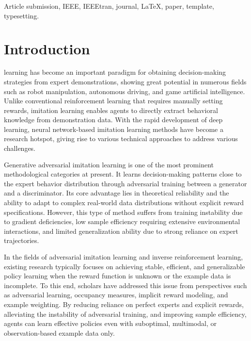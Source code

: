\documentclass[lettersize,journal]{IEEEtran}
\begin{document}
\begin{IEEEkeywords}
Article submission, IEEE, IEEEtran, journal, \LaTeX, paper, template, typesetting.
\end{IEEEkeywords}

\section{Introduction}
 learning has become an important paradigm for obtaining decision-making strategies from expert demonstrations, showing great potential in numerous fields such as robot manipulation, autonomous driving, and game artificial intelligence. Unlike conventional reinforcement learning that requires manually setting rewards, imitation learning enables agents to directly extract behavioral knowledge from demonstration data. With the rapid development of deep learning, neural network-based imitation learning methods have become a research hotspot, giving rise to various technical approaches to address various challenges.

Generative adversarial imitation learning is one of the most prominent methodological categories at present. It learns decision-making patterns close to the expert behavior distribution through adversarial training between a generator and a discriminator. Its core advantage lies in theoretical reliability and the ability to adapt to complex real-world data distributions without explicit reward specifications. However, this type of method suffers from training instability due to gradient deficiencies, low sample efficiency requiring extensive environmental interactions, and limited generalization ability due to strong reliance on expert trajectories.

In the fields of adversarial imitation learning and inverse reinforcement learning, existing research typically focuses on achieving stable, efficient, and generalizable policy learning when the reward function is unknown or the example data is incomplete. To this end, scholars have addressed this issue from perspectives such as adversarial learning, occupancy measures, implicit reward modeling, and example weighting. By reducing reliance on perfect experts and explicit rewards, alleviating the instability of adversarial training, and improving sample efficiency, agents can learn effective policies even with suboptimal, multimodal, or observation-based example data only.
\end{document}
